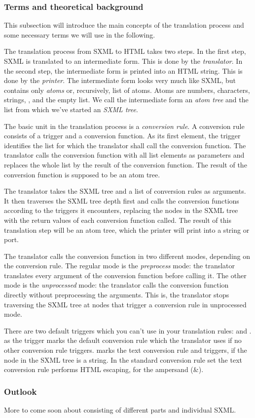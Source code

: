 \subsubsection{Terms and theoretical background}

This subsection will introduce the main concepts of the translation
process and some necessary terms we will use in the following.

The translation process from SXML to HTML takes two steps.  In the
first step, SXML is translated to an intermediate form.  This is done
by the \textit{translator}.  In the second step, the intermediate form
is printed into an HTML string.  This is done by the
\textit{printer}.  The intermediate form looks very much like SXML,
but contains only \textit{atoms} or, recursively, list of atoms.
Atoms are numbers, characters, strings, \sharpf, and the empty list.
We call the intermediate form an \textit{atom tree} and the list from
which we've started an \textit{SXML tree}.

The basic unit in the translation process is a \textit{conversion
rule}.  A conversion rule consists of a trigger and a conversion
function.  As its first element, the trigger identifies the list for
which the translator shall call the conversion function.  The
translator calls the conversion function with all list elements as
parameters and replaces the whole list by the result of the conversion
function.  The result of the conversion function is supposed to be an
atom tree.

The translator takes the SXML tree and a list of conversion rules as
arguments.  It then traverses the SXML tree depth first and calls the
conversion functions according to the triggers it encounters,
replacing the nodes in the SXML tree with the return values of each
conversion function called.  The result of this translation step will
be an atom tree, which the printer will print into a string or port.

The translator calls the conversion function in two different modes,
depending on the conversion rule.  The regular mode is the
\textit{preprocess} mode:  the translator translates every argument of
the conversion function before calling it.  The other mode is the
\textit{unprocessed} mode:  the translator calls the conversion
function directly without preprocessing the arguments.  This is, the
translator stops traversing the SXML tree at nodes that trigger a
conversion rule in unprocessed mode.  

There are two default triggers which you can't use in your translation
rules:  and .   as the
trigger marks the default conversion rule which the translator uses if
no other conversion rule triggers.   marks the text
conversion rule and triggers, if the node in the SXML tree is a
string.  In the standard conversion rule set the text conversion rule
performs HTML escaping, \eg for the ampersand (\&).


\subsubsection{Outlook}

More to come soon about \surflets consisting of different parts and
individual SXML.



%

